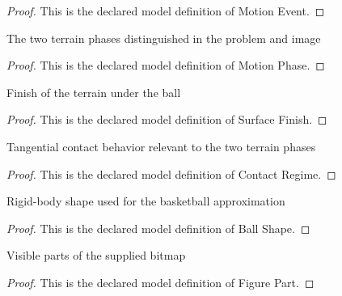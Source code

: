 \begin{proof}
  This is the declared model definition of Motion Event.
\end{proof}
\begin{definition}
  \label{def:physics:phyx-mini-0787:phyxminiproblems-problemphyxmini0787-motionphase}
  The two terrain phases distinguished in the problem and image
\end{definition}
\begin{proof}
  This is the declared model definition of Motion Phase.
\end{proof}
\begin{definition}
  \label{def:physics:phyx-mini-0787:phyxminiproblems-problemphyxmini0787-surfacefinish}
  Finish of the terrain under the ball
\end{definition}
\begin{proof}
  This is the declared model definition of Surface Finish.
\end{proof}
\begin{definition}
  \label{def:physics:phyx-mini-0787:phyxminiproblems-problemphyxmini0787-contactregime}
  Tangential contact behavior relevant to the two terrain phases
\end{definition}
\begin{proof}
  This is the declared model definition of Contact Regime.
\end{proof}
\begin{definition}
  \label{def:physics:phyx-mini-0787:phyxminiproblems-problemphyxmini0787-ballshape}
  Rigid-body shape used for the basketball approximation
\end{definition}
\begin{proof}
  This is the declared model definition of Ball Shape.
\end{proof}
\begin{definition}
  \label{def:physics:phyx-mini-0787:phyxminiproblems-problemphyxmini0787-figurepart}
  Visible parts of the supplied bitmap
\end{definition}
\begin{proof}
  This is the declared model definition of Figure Part.
\end{proof}
